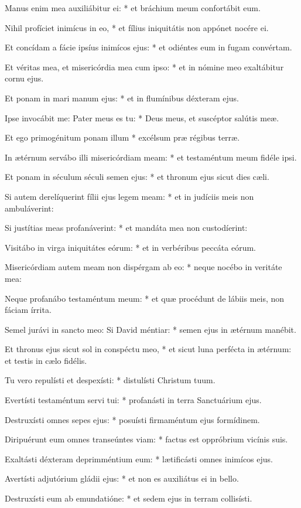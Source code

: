Manus enim mea auxiliábitur ei: * et bráchium meum confortábit eum.

Nihil profíciet inimícus in eo, * et fílius iniquitátis non appónet nocére ei.

Et concídam a fácie ipsíus inimícos ejus: * et odiéntes eum in fugam convértam.

Et véritas mea, et misericórdia mea cum ipso: * et in nómine meo exaltábitur cornu ejus.

Et ponam in mari manum ejus: * et in flumínibus déxteram ejus.

Ipse invocábit me: Pater meus es tu: * Deus meus, et suscéptor salútis meæ.

Et ego primogénitum ponam illum * excélsum præ régibus terræ.

In ætérnum servábo illi misericórdiam meam: * et testaméntum meum fidéle ipsi.

Et ponam in séculum séculi semen ejus: * et thronum ejus sicut dies cæli.

Si autem derelíquerint fílii ejus legem meam: * et in judíciis meis non ambuláverint:

Si justítias meas profanáverint: * et mandáta mea non custodíerint:

Visitábo in virga iniquitátes eórum: * et in verbéribus peccáta eórum.

Misericórdiam autem meam non dispérgam ab eo: * neque nocébo in veritáte mea:

Neque profanábo testaméntum meum: * et quæ procédunt de lábiis meis, non fáciam írrita.

Semel jurávi in sancto meo: Si David méntiar: * semen ejus in ætérnum manébit.

Et thronus ejus sicut sol in conspéctu meo, * et sicut luna perfécta in ætérnum: et testis in cælo fidélis.

Tu vero repulísti et despexísti: * distulísti Christum tuum.

Evertísti testaméntum servi tui: * profanásti in terra Sanctuárium ejus.

Destruxísti omnes sepes ejus: * posuísti firmaméntum ejus formídinem.

Diripuérunt eum omnes transeúntes viam: * factus est oppróbrium vicínis suis.

Exaltásti déxteram deprimméntium eum: * lætificásti omnes inimícos ejus.

Avertísti adjutórium gládii ejus: * et non es auxiliátus ei in bello.

Destruxísti eum ab emundatióne: * et sedem ejus in terram collisísti.

